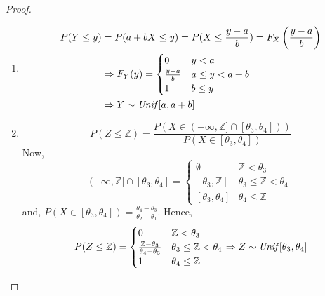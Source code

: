 \begin{proof} \quad                                                          \\
\begin{enumerate}[noitemsep, topsep=0em]
\item
\begin{align*}
    P(Y \leq y) &= P(a + bX \leq y)
                 = P(X \leq \frac{y - a}{b})
                 = F_X \left( \frac{y - a}{b} \right)                        \\
    &\Rightarrow F_Y(y) = \begin{cases}
        0                   & y < a                                          \\
        \frac{y - a}{b}     & a \leq y < a + b                               \\
        1                   & b \leq y
    \end{cases}                                                              \\
    &\Rightarrow Y \sim \text{\emph{Unif}}[a, a + b]
\end{align*}   
\item
\[
    P(Z \leq \mathbb{Z}) = \frac
        {P(X \in (-\infty, \mathbb{Z}] \cap [\theta_3, \theta_4]))}
        {P(X \in [\theta_3, \theta_4])}
\]
Now,
\[
    (-\infty, \mathbb{Z}] \cap [\theta_3, \theta_4] = \begin{cases}
        \emptyset               & \mathbb{Z} < \theta_3                      \\
        [\theta_3, \mathbb{Z}]  & \theta_3 \leq \mathbb{Z} < \theta_4        \\
        [\theta_3, \theta_4]    & \theta_4 \leq \mathbb{Z}
    \end{cases}
\]
and, $P(X \in [\theta_3, \theta_4]) = \frac{\theta_4 - \theta_3}{\theta_2 -
\theta_1}$. Hence,
\[
    P(Z \leq \mathbb{Z}) = \begin{cases}
        0                       & \mathbb{Z} < \theta_3                      \\
        \frac{\mathbb{Z}-\theta_3}{\theta_4 - \theta_3} 
            & \theta_3 \leq \mathbb{Z} < \theta_4                            \\
        1                       & \theta_4 \leq \mathbb{Z}
    \end{cases}
    \Rightarrow
    Z \sim \text{\emph{Unif}}[\theta_3, \theta_4]
\]
\end{enumerate}
\end{proof}


